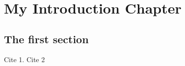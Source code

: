 \documentclass[a4paper,oneside,11pt]{book}
\begin{document}
\MakeTitle 
{} 
\tableofcontents
\cleardoublepage 
{} 

\chapter[Introduction]{My Introduction Chapter}
\section{The first section}
Cite 1\citep{AUT2018}.\vspace{0.25cm}
\noindent Cite 2 \citep{AUT1999}

\end{document}
